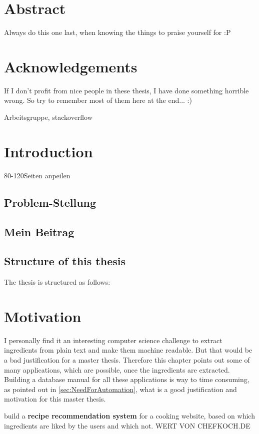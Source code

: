 \documentclass[12pt, twoside]{report}
\begin{document}
\chapter*{Abstract}
Always do this one last, when knowing the things to praise  yourself for :P

\chapter*{Acknowledgements}
If I don't profit from nice people in these thesis, I have done something horrible wrong. So try to remember most of them here at the end... :)

Arbeitsgruppe, stackoverflow
\tableofcontents

\listoffigures
\begingroup
	\let\clearpage\relax
	\listoftables
\endgroup

\clearpage
{}  
\chapter{Introduction}
80-120Seiten anpeilen
\section{Problem-Stellung}
\section{Mein Beitrag}
\section{Structure of this thesis}
The thesis is structured as follows:



\chapter{Motivation}
I personally find it an interesting computer science challenge to extract ingredients from plain text and make them machine readable. But that would be a bad justification for a master thesis. Therefore this chapter points out some of many applications, which are possible, once the ingredients are extracted. Building a database manual for all these applications is way to time consuming, as pointed out in \ref{sec:NeedForAutomation}, what is a good justification and motivation for this master thesis.

\parencite{recipeRecommendation} build a \textbf{recipe recommendation system} for a cooking website, based on which ingredients are liked by the users and which not. WERT VON CHEFKOCH.DE
\end{document}
